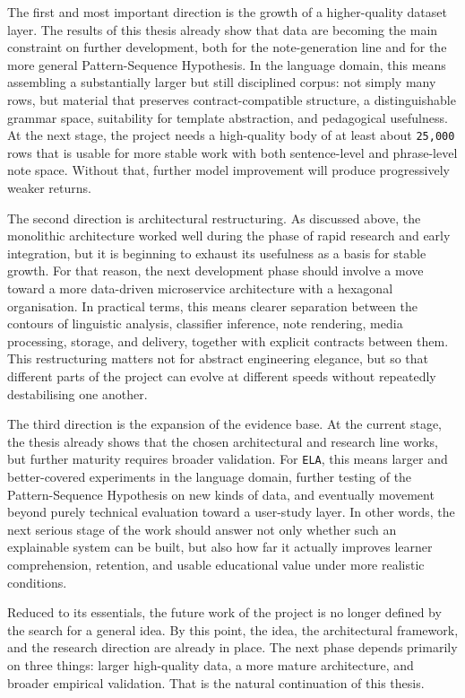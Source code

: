 \documentclass[12pt,a4paper,oneside]{report}
\begin{document}
The first and most important direction is the growth of a higher-quality dataset layer. The results of this thesis already show that data are becoming the main constraint on further development, both for the note-generation line and for the more general Pattern-Sequence Hypothesis. In the language domain, this means assembling a substantially larger but still disciplined corpus: not simply many rows, but material that preserves contract-compatible structure, a distinguishable grammar space, suitability for template abstraction, and pedagogical usefulness. At the next stage, the project needs a high-quality body of at least about \texttt{25,000} rows that is usable for more stable work with both sentence-level and phrase-level note space. Without that, further model improvement will produce progressively weaker returns.

The second direction is architectural restructuring. As discussed above, the monolithic architecture worked well during the phase of rapid research and early integration, but it is beginning to exhaust its usefulness as a basis for stable growth. For that reason, the next development phase should involve a move toward a more data-driven microservice architecture with a hexagonal organisation. In practical terms, this means clearer separation between the contours of linguistic analysis, classifier inference, note rendering, media processing, storage, and delivery, together with explicit contracts between them. This restructuring matters not for abstract engineering elegance, but so that different parts of the project can evolve at different speeds without repeatedly destabilising one another.

The third direction is the expansion of the evidence base. At the current stage, the thesis already shows that the chosen architectural and research line works, but further maturity requires broader validation. For \texttt{ELA}, this means larger and better-covered experiments in the language domain, further testing of the Pattern-Sequence Hypothesis on new kinds of data, and eventually movement beyond purely technical evaluation toward a user-study layer. In other words, the next serious stage of the work should answer not only whether such an explainable system can be built, but also how far it actually improves learner comprehension, retention, and usable educational value under more realistic conditions.

Reduced to its essentials, the future work of the project is no longer defined by the search for a general idea. By this point, the idea, the architectural framework, and the research direction are already in place. The next phase depends primarily on three things: larger high-quality data, a more mature architecture, and broader empirical validation. That is the natural continuation of this thesis.
\end{document}
